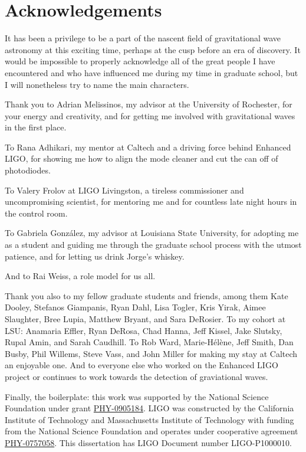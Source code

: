 \chapter*{Acknowledgements}

It has been a privilege to be a part of the nascent field of
gravitational wave astronomy at this exciting time, perhaps at the
cusp before an era of discovery.  It would be impossible to properly
acknowledge all of the great people I have encountered and who have
influenced me during my time in graduate school, but I will nonetheless
try to name the main characters.

Thank you to Adrian Melissinos, my advisor at the University of
Rochester, for your energy and creativity, and for getting me involved
with gravitational waves in the first place.  

To Rana Adhikari, my mentor at Caltech and a driving force behind
Enhanced LIGO, for showing me how to align the mode cleaner and cut
the can off of photodiodes.

To Valery Frolov at LIGO Livingston, a tireless commissioner and
uncompromising scientist, for mentoring me and for countless late
night hours in the control room.

To Gabriela Gonz\'alez, my advisor at Louisiana State University, for
adopting me as a student and guiding me through the graduate school
process with the utmost patience, and for letting us drink Jorge's
whiskey.

And to Rai Weiss, a role model for us all.

Thank you also to my fellow graduate students and friends, among them
Kate Dooley, Stefanos Giampanis, Ryan Dahl, Lisa Togler, Kris Yirak,
Aimee Slaughter, Bree Lupia, Matthew Bryant, and Sara DeRosier.  To
my cohort at LSU: Anamaria Effler, Ryan DeRosa, Chad Hanna, Jeff
Kissel, Jake Slutsky, Rupal Amin, and Sarah Caudhill.  To Rob Ward,
Marie-H\'el\`ene, Jeff Smith, Dan Busby, Phil Willems, Steve Vass, and
John Miller for making my stay at Caltech an enjoyable one.  And to
everyone else who worked on the Enhanced LIGO project or continues to
work towards the detection of graviational waves.


Finally, the boilerplate: this work was supported by the National
Science Foundation under grant
\href{http://www.nsf.gov/awardsearch/showAward.do?AwardNumber=0905184}{PHY-0905184}.
LIGO was constructed by the California Institute of Technology and
Massachusetts Institute of Technology with funding from the National
Science Foundation and operates under cooperative agreement
\href{http://www.nsf.gov/awardsearch/showAward.do?AwardNumber=0757058}{PHY-0757058}.
This dissertation has LIGO Document number LIGO-P1000010.

